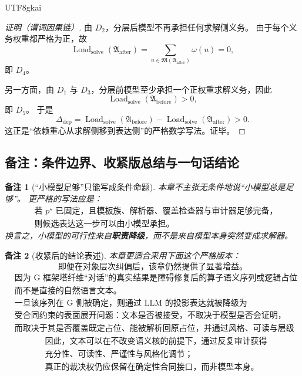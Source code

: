 \documentclass[12pt]{article}
\newtheorem{remark}{备注}[section]
\begin{document}
\begin{CJK*}{UTF8}{gkai}
\begin{proof}[证明（谓词因果链）]
由 $D_2$，分层后模型不再承担任何求解侧义务。
由于每个义务权重都严格为正，故
\[
  \operatorname{Load}_{\mathrm{solve}}(\mathfrak{A}_{\mathrm{after}})
  =
  \sum_{u\in \mathfrak{M}(\mathfrak{A}_{\mathrm{after}})}\omega(u)
  =0,
\]
即 $D_4$。

另一方面，由 $D_1$ 与 $D_3$，分层前模型至少承担一个正权重求解义务，因此
\[
  \operatorname{Load}_{\mathrm{solve}}(\mathfrak{A}_{\mathrm{before}})>0,
\]
即 $D_5$。
于是
\[
  \Delta_{\mathrm{dep}}
  =
  \operatorname{Load}_{\mathrm{solve}}(\mathfrak{A}_{\mathrm{before}})
  -
  \operatorname{Load}_{\mathrm{solve}}(\mathfrak{A}_{\mathrm{after}})
  >
  0.
\]
这正是“依赖重心从求解侧移到表达侧”的严格数学写法。证毕。
\end{proof}

\subsection{备注：条件边界、收紧版总结与一句话结论}
\label{subsec:tex37-ch5-remarks}

\begin{remark}[“小模型足够”只能写成条件命题]
本章不主张无条件地说“小模型总是足够”。
更严格的写法应是：
\[
  \boxed{
    \begin{aligned}
      &\text{若 }p^\star\text{ 已固定，且模板族、解析器、覆盖检查器与审计器足够完备，}\\
      &\text{则候选表达这一步可以由小模型承担。}
    \end{aligned}
  }
\]
换言之，小模型的可行性来自\textbf{职责降级}，而不是来自模型本身突然变成求解器。
\end{remark}

\begin{remark}[收紧后的结论表述]
本章更适合采用下面这个严格版本：
\[
  \boxed{
    \text{即便在对象层次纠偏后，该章仍然提供了显著增益。}
  }
\]
\[
  \boxed{
    \begin{aligned}
      &\text{因为 G 框架塔纤维“对话”的真实结果是障碍修复后的算子语义序列或逻辑占位序列，}\\
      &\text{而不是直接的自然语言文本。}
    \end{aligned}
  }
\]
\[
  \boxed{
    \begin{aligned}
      &\text{一旦该序列在 G 侧被确定，则通过 LLM 的投影表达就被降级为}\\
      &\text{受合同约束的表面展开问题：文本是否被接受，不取决于模型是否会证明，}\\
      &\text{而取决于其是否覆盖既定占位、能被解析回原占位，并通过风格、可读与层级审计。}
    \end{aligned}
  }
\]
\[
  \boxed{
    \begin{aligned}
      &\text{因此，文本可以在不改变语义核的前提下，通过反复审计获得}\\
      &\text{充分性、可读性、严谨性与风格化调节；}\\
      &\text{真正的裁决权仍应保留在确定性合同接口，而非模型本身。}
    \end{aligned}
  }
\]
\end{remark}


\end{CJK*}
\end{document}
